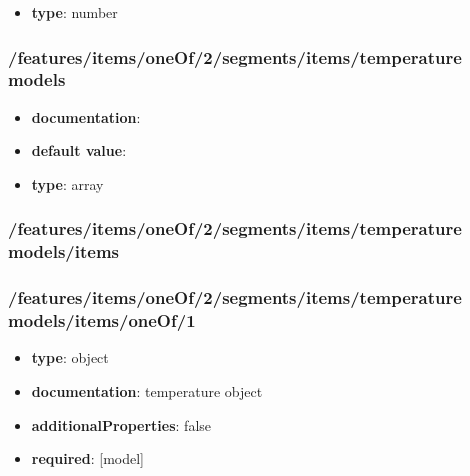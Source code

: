 \begin{itemize}\item {\bf type}: number
\end{itemize}\subsubsection{/features/items/oneOf/2/segments/items/temperature models}
\begin{itemize}\item {\bf documentation}: 
\item {\bf default value}: 
\item {\bf type}: array
\end{itemize}\subsubsection{/features/items/oneOf/2/segments/items/temperature models/items}

\subsubsection{/features/items/oneOf/2/segments/items/temperature models/items/oneOf/1}
\begin{itemize}\item {\bf type}: object
\item {\bf documentation}: temperature object
\item {\bf additionalProperties}: false
\item {\bf required}: [model]\end{itemize}
